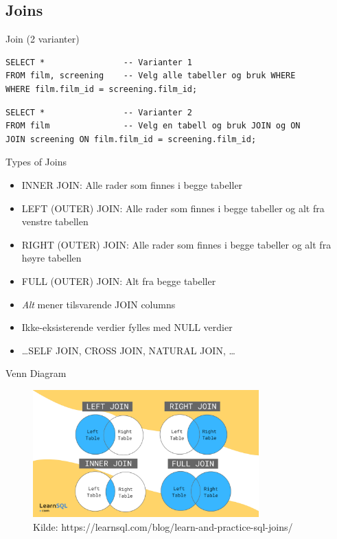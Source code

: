 \subsection*{Joins}
\begin{frame}[fragile]{Join (2 varianter)}
\begin{verbatim}
SELECT *                -- Varianter 1
FROM film, screening    -- Velg alle tabeller og bruk WHERE
WHERE film.film_id = screening.film_id;
\end{verbatim}
\pause
\begin{verbatim}
SELECT *                -- Varianter 2
FROM film               -- Velg en tabell og bruk JOIN og ON
JOIN screening ON film.film_id = screening.film_id;
\end{verbatim}
\end{frame}

\begin{frame}{Types of Joins}
\begin{itemize}[<+->]
    \item INNER JOIN: Alle rader som finnes i begge tabeller
    \item LEFT (OUTER) JOIN: Alle rader som finnes i begge tabeller og alt fra venstre tabellen
    \item RIGHT (OUTER) JOIN: Alle rader som finnes i begge tabeller og alt fra høyre tabellen
    \item FULL (OUTER) JOIN: Alt fra begge tabeller
    \item \textit{Alt} mener tilsvarende JOIN columns
    \item Ikke-eksisterende verdier fylles med NULL verdier
    \item \dots SELF JOIN, CROSS JOIN, NATURAL JOIN, \dots
\end{itemize}
\end{frame}

\begin{frame}{Venn Diagram}
    \begin{figure}
        \centering
        \includegraphics[height = 4.9cm]{images/joins.png}
        \caption{Kilde:
        https://learnsql.com/blog/learn-and-practice-sql-joins/}
        \label{fig:venndiagram}
    \end{figure}
\end{frame}

